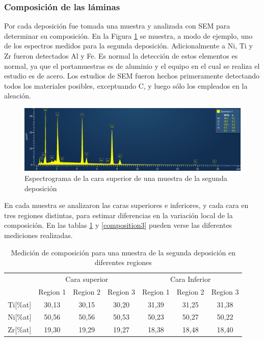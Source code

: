 \documentclass{article}
\theoremstyle{definition}
\theoremstyle{remark}
\begin{document}
\subsubsection{Composición de las láminas}

Por cada deposición fue tomada una muestra y analizada con SEM para determinar su composición. En la Figura \ref{dep2} se muestra, a modo de ejemplo, uno de los espectros medidos para la segunda deposición. Adicionalmente a Ni, Ti y Zr fueron detectados Al y Fe. Es normal la detección de estos elementos es normal, ya que el portamuestras es de aluminio y el equipo en el cual se realiza el estudio es de acero. Los estudios de SEM fueron hechos primeramente detectando todos los materiales posibles, exceptuando C, y luego sólo los empleados en la aleación.

 \begin{figure}[H]
 	\centering
	\includegraphics[scale=0.5]{img/dep2.png}
 	\caption{Espectrograma de la cara superior de una muestra de la segunda deposición}
	\label{dep2}
\end{figure} 

En cada muestra se analizaron las caras superiores e inferiores, y cada cara en tres regiones distintas, para estimar diferencias en la variación local de la composición. En las tablas \ref{composition2} y \ref{composition3} pueden verse las diferentes mediciones realizadas.

\begin{table}[H]
\begin{tabular}{c|c|c|c|c|c|c|}
\cline{2-7}
\multicolumn{1}{l|}{} & \multicolumn{3}{c|}{Cara superior} & \multicolumn{3}{c|}{Cara Inferior} \\ \cline{2-7} 
\multicolumn{1}{l|}{} & Region 1 & Region 2 & Region 3 & Region 1 & Region 2 & Region 3 \\ \hline
\multicolumn{1}{|c|}{Ti{[}\%at{]}} & 30,13 & 30,15 & 30,20 & 31,39 & 31,25 & 31,38 \\ \hline
\multicolumn{1}{|c|}{Ni{[}\%at{]}} & 50,56 & 50,56 & 50,53 & 50,23 & 50,27 & 50,22 \\ \hline
\multicolumn{1}{|c|}{Zr{[}\%at{]}} & 19,30 & 19,29 & 19,27 & 18,38 & 18,48 & 18,40 \\ \hline
\end{tabular}
\caption{Medición de composición para una muestra de la segunda deposición en diferentes regiones}
\label{composition2}
\end{table}
\end{document}
